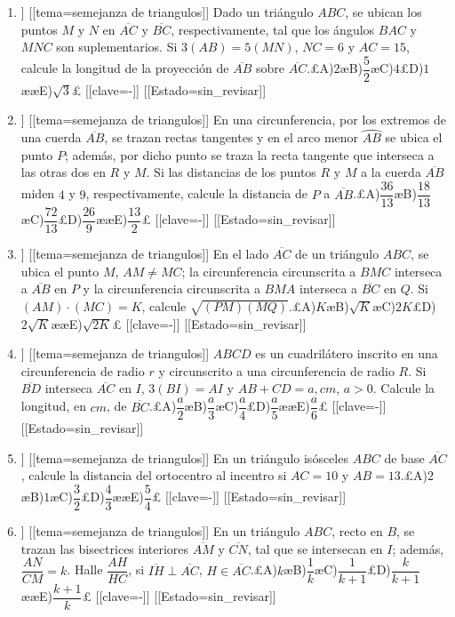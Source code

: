 \begin{enumerate}
\item[\textbf{19.}] [[curso=Geometria]] [[tema=semejanza de triangulos]] Dado un triángulo $ABC$, se ubican los puntos $M$ y $N$ en $\overline{AC}$ y $\overline{BC}$, respectivamente, tal que los ángulos $BAC$ y $MNC$ son suplementarios. Si $3(AB)=5(MN)$, $NC=6$ y $AC=15$, calcule la longitud de la proyección de $\overline{AB}$ sobre $\overline{AC}$.£A)$2$æB)$\dfrac{5}{2}$æC)$4$£D)$1$ææE)$\sqrt{3}$£ [[clave=-]] [[Estado=sin_revisar]]
\item[\textbf{20.}] [[curso=Geometria]] [[tema=semejanza de triangulos]] En una circunferencia, por los extremos de una cuerda $\overline{AB}$, se trazan rectas tangentes y en el arco menor $\overparen{AB}$ se ubica el punto $P$; además, por dicho punto se traza la recta tangente que interseca a las otras dos en $R$ y $M$. Si las distancias de los puntos $R$ y $M$ a la cuerda $\overline{AB}$ miden $4$ y $9$, respectivamente, calcule la distancia de $P$ a $\overline{AB}$.£A)$\dfrac{36}{13}$æB)$\dfrac{18}{13}$æC)$\dfrac{72}{13}$£D)$\dfrac{26}{9}$ææE)$\dfrac{13}{2}$£ [[clave=-]] [[Estado=sin_revisar]]
\item[\textbf{21.}] [[curso=Geometria]] [[tema=semejanza de triangulos]] En el lado $\overline{AC}$ de un triángulo $ABC$, se ubica el punto $M$, $AM\neq MC$; la circunferencia circunscrita a $BMC$ interseca a $\overline{AB}$ en $P$ y la circunferencia circunscrita a $BMA$ interseca a $\overline{BC}$ en $Q$. Si $(AM)\cdot(MC)=K$, calcule $\sqrt{(PM)(MQ)}$.£A)$K$æB)$\sqrt{K}$æC)$2K$£D)$2\sqrt{K}$ææE)$\sqrt{2K}$£ [[clave=-]] [[Estado=sin_revisar]]
\item[\textbf{22.}] [[curso=Geometria]] [[tema=semejanza de triangulos]] $ABCD$ es un cuadrilátero inscrito en una circunferencia de radio $r$ y circunscrito a una circunferencia de radio $R$. Si $\overline{BD}$ interseca $\overline{AC}$ en $I$, $3(BI)=AI$ y $AB+CD=a,cm$, $a>0$. Calcule la longitud, en $cm$, de $\overline{BC}$.£A)$\dfrac{a}{2}$æB)$\dfrac{a}{3}$æC)$\dfrac{a}{4}$£D)$\dfrac{a}{5}$ææE)$\dfrac{a}{6}$£ [[clave=-]] [[Estado=sin_revisar]]
\item[\textbf{23.}] [[curso=Geometria]] [[tema=semejanza de triangulos]] En un triángulo isósceles $ABC$ de base $\overline{AC}$, calcule la distancia del ortocentro al incentro si $AC=10$ y $AB=13$.£A)$2$æB)$1$æC)$\dfrac{3}{2}$£D)$\dfrac{4}{3}$ææE)$\dfrac{5}{4}$£ [[clave=-]] [[Estado=sin_revisar]]
\item[\textbf{24.}] [[curso=Geometria]] [[tema=semejanza de triangulos]] En un triángulo $ABC$, recto en $B$, se trazan las bisectrices interiores $\overline{AM}$ y $\overline{CN}$, tal que se intersecan en $I$; además, $\dfrac{AN}{CM}=k$. Halle $\dfrac{AH}{HC}$, si $\overline{IH}\perp\overline{AC}$, $H\in\overline{AC}$.£A)$k$æB)$\dfrac{1}{k}$æC)$\dfrac{1}{k+1}$£D)$\dfrac{k}{k+1}$ææE)$\dfrac{k+1}{k}$£ [[clave=-]] [[Estado=sin_revisar]]

\end{enumerate}

